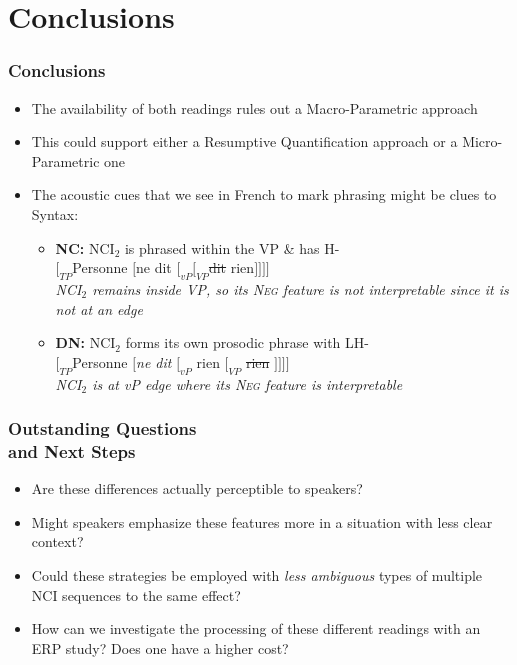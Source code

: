 \documentclass{beamer}
\begin{document}
\section{Conclusions}
\begin{frame}
\frametitle{Conclusions}
\begin{itemize}
\item The availability of both readings rules out a Macro-Parametric approach
\item This could support either a Resumptive Quantification approach or a Micro-Parametric one
\item The acoustic cues that we see in French to mark phrasing might be clues to Syntax:
\begin{itemize}
\item \textbf{NC:} NCI$_{2}$ is phrased within the VP \& has H-\\
$[_{TP}$Personne $[$ne dit $[_{vP}[_{VP}$\sout{dit} \alert{rien}$]]]]$\\
\textit{NCI$_{2}$ remains inside VP, so its \textsc{Neg} feature is not interpretable since it is not at an edge}
\item \textbf{DN:} NCI$_{2}$ forms its own prosodic phrase with LH-\\
$[_{TP}$Personne $[$\textit{ne dit} $[_{vP}$ \alert{rien} $[_{VP}$ \sout{rien} $]]]]$\\
\textit{NCI$_{2}$ is at vP edge where its \textsc{Neg} feature is interpretable}
\end{itemize}
\end{itemize}
\end{frame}
\begin{frame}
\frametitle{Outstanding Questions\\ and Next Steps}
\begin{itemize}
\item Are these differences actually perceptible to speakers?
\item Might speakers emphasize these features more in a situation with less clear context?
\item Could these strategies be employed with \textit{less ambiguous} types of multiple NCI sequences to the same effect?
\item How can we investigate the processing of these different readings with an ERP study? Does one have a higher cost?
\end{itemize}
\end{frame}
\end{document}
